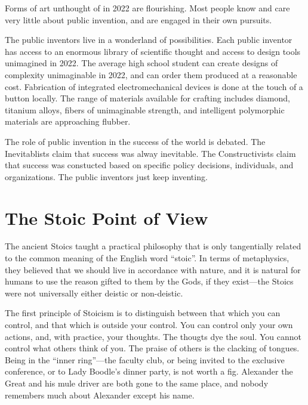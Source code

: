\documentclass[
	fontsize=10pt, %
	twoside=false, %
	secnumdepth=1, %
]{kaobook}
\begin{document}
Forms of art unthought of in 2022 are flourishing.
Most people know and care very little about public invention,
and are engaged in their own pursuits.

The public inventors live in a wonderland of possibilities.
Each public inventor has access to an enormous library of
scientific thought and access to design tools unimagined in 2022.
The average high school student can create designs of
complexity unimaginable in 2022, and can order them
produced at a reasonable cost.
Fabrication of integrated electromechanical devices is
done at the touch of a button locally.
The range of materials available for crafting includes
diamond, titanium alloys, fibers of unimaginable strength,
and intelligent polymorphic materials are approaching flubber.

The role of public invention in the success of the world is
debated. The Inevitablists claim that success was alway inevitable.
The Constructivists claim that success was constucted based on
specific policy decisions, individuals, and organizations.
The public inventors just keep inventing.

\chapter{The Stoic Point of View}

The ancient Stoics taught a practical philosophy that is only
tangentially related to the common meaning of the English word ``stoic''.
In terms of metaphysics, they believed that we should live in
accordance with nature, and it is natural for humans to use the reason
gifted to them by the Gods, if they exist---the Stoics were not
universally either deistic or non-deistic.

The first principle of Stoicism
is to distinguish between that which you can control, and that which
is outside your control.  You can control only your own actions, and,
with practice, your thoughts. The thougts dye the soul.  You cannot
control what others think of you.  The praise of others is the clacking
of tongues.  Being in the ``inner ring''---the faculty club, or being
invited to the exclusive conference, or to Lady Boodle's dinner party,
is not worth a fig.
Alexander the Great and his mule driver are both gone to the same place,
and nobody remembers much about Alexander except his name.
\end{document}
